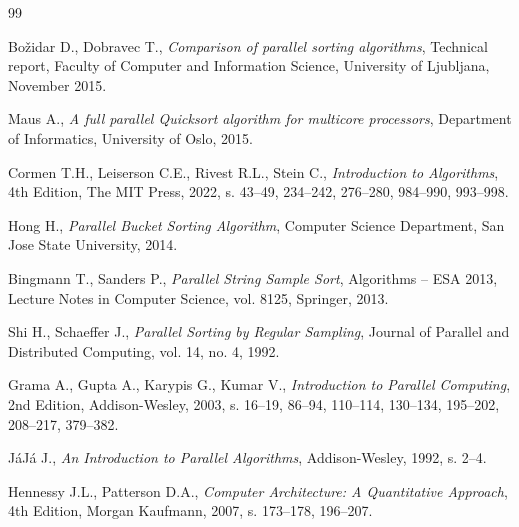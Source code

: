 
\cleardoublepage


\begin{thebibliography}{99}


Božidar D., Dobravec T., \textit{Comparison of parallel sorting algorithms}, Technical report, Faculty of Computer and Information Science, University of Ljubljana, November 2015.

Maus A., \textit{A full parallel Quicksort algorithm for multicore processors}, Department of Informatics, University of Oslo, 2015.

Cormen T.H., Leiserson C.E., Rivest R.L., Stein C., \textit{Introduction to Algorithms}, 4th Edition, The MIT Press, 2022, s. 43--49, 234--242, 276--280, 984--990, 993--998.

Hong H., \textit{Parallel Bucket Sorting Algorithm}, Computer Science Department, San Jose State University, 2014.

Bingmann T., Sanders P., \textit{Parallel String Sample Sort}, Algorithms -- ESA 2013, Lecture Notes in Computer Science, vol. 8125, Springer, 2013.

Shi H., Schaeffer J., \textit{Parallel Sorting by Regular Sampling}, Journal of Parallel and Distributed Computing, vol. 14, no. 4, 1992.

Grama A., Gupta A., Karypis G., Kumar V., \textit{Introduction to Parallel Computing}, 2nd Edition, Addison-Wesley, 2003, s. 16--19, 86--94, 110--114, 130--134, 195--202, 208--217, 379--382.

JáJá J., \textit{An Introduction to Parallel Algorithms}, Addison-Wesley, 1992, s. 2--4.

Hennessy J.L., Patterson D.A., \textit{Computer Architecture: A Quantitative Approach}, 4th Edition, Morgan Kaufmann, 2007, s. 173--178, 196--207.


\end{thebibliography}

